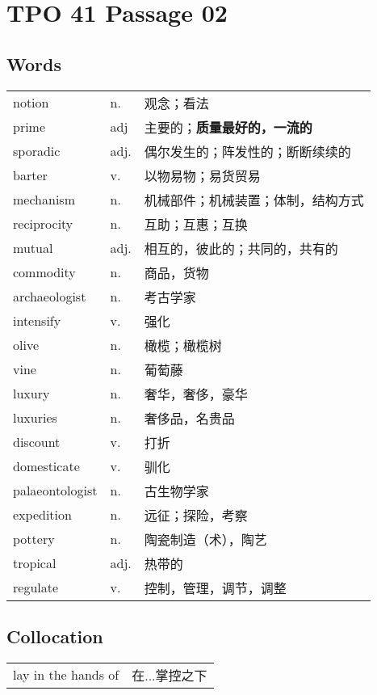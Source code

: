 \section{TPO 41 Passage 02}

\subsection{Words}

\begin{tabular}{lll}
    notion          & n.   & 观念；看法                  \\
    prime           & adj  & 主要的；\textbf{质量最好的，一流的} \\
    sporadic        & adj. & 偶尔发生的；阵发性的；断断续续的       \\
    barter          & v.   & 以物易物；易货贸易              \\
    mechanism       & n.   & 机械部件；机械装置；体制，结构方式      \\
    reciprocity     & n.   & 互助；互惠；互换               \\
    mutual          & adj. & 相互的，彼此的；共同的，共有的        \\
    commodity       & n.   & 商品，货物                  \\
    archaeologist   & n.   & 考古学家                   \\
    intensify       & v.   & 强化                     \\
    olive           & n.   & 橄榄；橄榄树                 \\
    vine            & n.   & 葡萄藤                    \\
    luxury          & n.   & 奢华，奢侈，豪华               \\
    luxuries        & n.   & 奢侈品，名贵品                \\
    discount        & v.   & 打折                     \\
    domesticate     & v.   & 驯化                     \\
    palaeontologist & n.   & 古生物学家                  \\
    expedition      & n.   & 远征；探险，考察               \\
    pottery         & n.   & 陶瓷制造（术），陶艺             \\
    tropical        & adj. & 热带的                    \\
    regulate        & v.   & 控制，管理，调节，调整            \\
\end{tabular}

\subsection{Collocation}

\begin{tabular}{ll}
    lay in the hands of & 在...掌控之下 \\
\end{tabular}

\newpage

